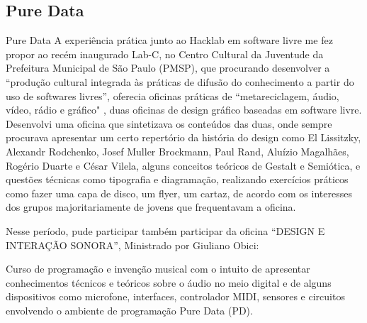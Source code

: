 \subsection{Pure Data}

Pure Data
A experiência prática junto ao Hacklab em software livre me fez propor ao recém inaugurado Lab-C, no Centro Cultural da Juventude da Prefeitura Municipal de São Paulo (PMSP), que procurando desenvolver a ``produção cultural integrada às práticas de difusão do conhecimento a partir do uso de softwares livres'', oferecia oficinas práticas de ``metareciclagem, áudio, vídeo, rádio e gráfico" \cite{PMSP2008}, duas oficinas de design gráfico baseadas em software livre. Desenvolvi uma oficina que sintetizava os conteúdos das duas, onde sempre procurava apresentar um certo repertório da história do design como El Lissitzky, Alexandr Rodchenko, Josef Muller Brockmann, Paul Rand, Aluízio Magalhães, Rogério Duarte e César Vilela, alguns conceitos teóricos de Gestalt e Semiótica, e questões técnicas como tipografia e diagramação, realizando exercícios práticos como fazer uma capa de disco, um flyer, um cartaz, de acordo com os interesses dos grupos majoritariamente de jovens que frequentavam a oficina. 

Nesse período, pude participar também participar da oficina ``DESIGN E INTERAÇÃO SONORA'', Ministrado por Giuliano Obici:
\begin{citacao}
Curso de programação e invenção musical com o intuito de apresentar conhecimentos técnicos e teóricos sobre o áudio no meio digital e de alguns dispositivos como microfone, interfaces, controlador MIDI, sensores e circuitos envolvendo o ambiente de programação Pure Data (PD). \cite{PMSP2008}
\end{citacao}

